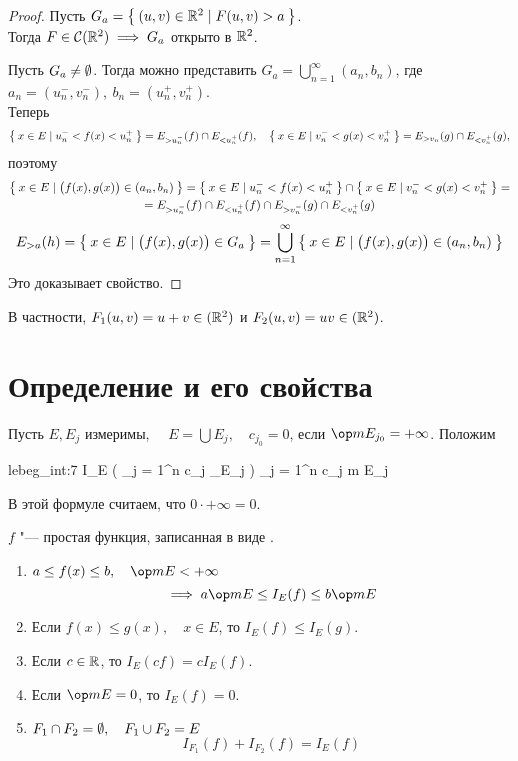 \begin{proof}

	Пусть $ G_a = \Set{(u, v) \in \ensuremath{\mathbb{R}}^2 \mid F(u, v) > a} $. \\
	Тогда $ F \in \mathcal C(\mathbb{R}^2) \implies G_a $ открыто в $ \mathbb{R}^2 $.

	Пусть $ G_a \ne \emptyset $. Тогда можно представить $ G_a = \bigcup_{n = 1}^\infty (a_n, b_n) $, где $ a_n = (u_n^-, v_n^-), ~ b_n = (u_n^+, v_n^+) $. \\
	Теперь
	$$ \Set{x \in E \mid u_n^- < f(x) < u_n^+} = E_{>u_n^-}(f) \cap E_{<u_n^+}(f), \quad \Set{x \in E \mid v_n^- < g(x) < v_n^+} = E_{>v_n}(g) \cap E_{<v_n^+}(g), $$
	поэтому
	\begin{multline*}
		\Set{x \in E \mid \bigl( f(x), g(x) \bigr) \in (a_n, b_n)} = \Set{x \in E \mid u_n^- < f(x) < u_n^+} \cap \Set{x \in E \mid v_n^- < g(x) < v_n^+} = \\
		= E_{>u_n^-}(f) \cap E_{<u_n^+}(f) \cap E_{>v_n^-}(g) \cap E_{<v_n^+}(g)
	\end{multline*}
	$$ E_{>a}(h) = \Set{x \in E \mid \bigl( f(x), g(x) \bigr) \in G_a} = \bigcup_{n = 1}^\infty \Set{x \in E \mid \bigl( f(x), g(x) \bigr) \in (a_n, b_n)} $$
	Это доказывает свойство.
\end{proof}

В частности, $ F_1(u, v) = u + v \in \mathcal(\mathbb{R}^2) $ и $ F_2(u, v) = uv \in \mathcal(\mathbb{R}^2) $.

\section{Определение  и его свойства}

\begin{definition}
	Пусть $ E, E_j $ измеримы, $ \quad E = \bigcup E_j, \quad c_{j_0} = 0 $, если $ \op m E_{j_0} = +\infty $.
	Положим
	\begin{equ}{lebeg_int:7}
		I_E \Bigl( \sum_{j = 1}^n c_j \chi_{E_j} \Bigr) \coloneq \sum_{j = 1}^n c_j \op m E_j
	\end{equ}
	В этой формуле считаем, что $ 0 \cdot +\infty = 0 $.
\end{definition}

\begin{properties}
	$ f $ "--- простая функция, записанная в виде .
	\begin{enumerate}
		\item $ a \le f(x) \le b, \quad \op m E < +\infty $
			$$ \implies a \op m E \le I_E(f) \le b \op m E $$

		\item Если $ f(x) \le g(x), \quad x \in E $, то $ I_E(f) \le I_E(g) $.

		\item Если $ c \in \mathbb{R} $, то $ I_E(cf) = cI_E(f) $.

		\item \label{en:lebeg_int:4} Если $ \op m E = 0 $, то $ I_E(f) = 0 $.

		\item \label{en:lebeg_int:6} $ F_1 \cap F_2 = \emptyset, \quad F_1 \cup F_2 = E $
			$$ I_{F_1}(f) + I_{F_2}(f) = I_E(f) $$
	\end{enumerate}
\end{properties}


